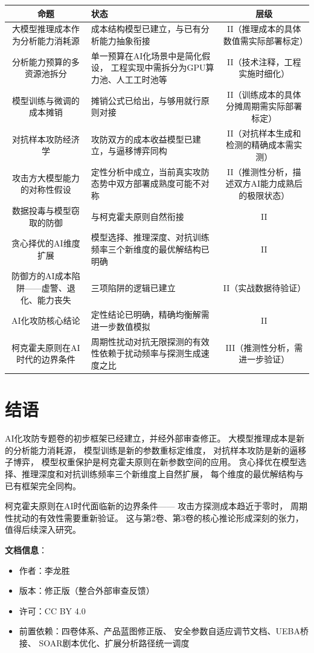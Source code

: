 \documentclass[11pt,a4paper]{article}
\begin{document}
\begin{center}
\begin{xltabular}{\textwidth}{c|X|c}
\toprule
\textbf{命题} & \textbf{状态} & \textbf{层级} \\
\midrule
大模型推理成本作为分析能力消耗源 &
成本结构模型已建立，与已有分析能力抽象衔接 &
II（推理成本的具体数值需实际部署标定） \\
分析能力预算的多资源池拆分 &
单一预算在AI化场景中是简化假设，
工程实现中需拆分为GPU算力池、人工工时池等 &
II（技术注释，工程实施时细化） \\
模型训练与微调的成本摊销 &
摊销公式已给出，与够用就行原则对接 &
II（训练成本的具体分摊周期需实际部署标定） \\
对抗样本攻防经济学 &
攻防双方的成本收益模型已建立，与逼移博弈同构 &
II（对抗样本生成和检测的精确成本需实测） \\
攻击方大模型能力的对称性假设 &
定性分析中成立，当前真实攻防态势中双方部署成熟度可能不对称 &
II（推测性分析，描述双方AI能力成熟后的极限状态） \\
数据投毒与模型窃取的防御 &
与柯克霍夫原则自然衔接 &
II \\
贪心择优的AI维度扩展 &
模型选择、推理深度、对抗训练频率三个新维度的最优解结构已明确 &
II \\
防御方的AI成本陷阱——虚警、退化、能力丧失 &
三项陷阱的逻辑已建立 &
II（实战数据待验证） \\
AI化攻防核心结论 &
定性结论已明确，精确均衡解需进一步数值模拟 &
II \\
柯克霍夫原则在AI时代的边界条件 &
周期性扰动对抗无限探测的有效性依赖于扰动频率与探测生成速度之比 &
III（推测性分析，需进一步验证） \\
\bottomrule
\end{xltabular}
\end{center}

\section{结语}

AI化攻防专题卷的初步框架已经建立，并经外部审查修正。
大模型推理成本是新的分析能力消耗源，
模型训练是新的参数重标定维度，
对抗样本攻防是新的逼移子博弈，
模型权重保护是柯克霍夫原则在新参数空间的应用。
贪心择优在模型选择、推理深度和对抗训练频率三个新维度上自然扩展，
每个维度的最优解结构与已有框架完全同构。

柯克霍夫原则在AI时代面临新的边界条件——
攻击方探测成本趋近于零时，
周期性扰动的有效性需要重新验证。
这与第2卷、第3卷的核心推论形成深刻的张力，
值得后续深入研究。

\vspace{5mm}
\noindent\textbf{文档信息}：
\begin{itemize}
    \item 作者：李龙胜
    \item 版本：修正版（整合外部审查反馈）
    \item 许可：CC BY 4.0
    \item 前置依赖：四卷体系、产品蓝图修正版、
          安全参数自适应调节文档、UEBA桥接、
          SOAR剧本优化、扩展分析路径统一调度
\end{itemize}
\end{document}

